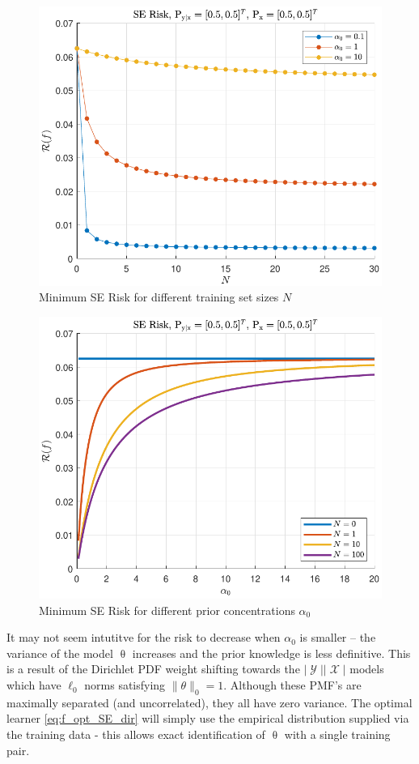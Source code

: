 \documentclass[12pt]{report}
\DeclareMathOperator{\Xcal}{\mathcal{X}}
\DeclareMathOperator{\Ycal}{\mathcal{Y}}
\begin{document}
\begin{figure}
\centering
\includegraphics[width=0.7\linewidth]{Risk_SE_Dir_IO_N_leg_a0.pdf}
\caption{Minimum SE Risk for different training set sizes $N$}
\label{fig:Risk_SE_Dir_IO_N_leg_a0}
\end{figure}

\begin{figure}
\centering
\includegraphics[width=0.7\linewidth]{Risk_SE_Dir_IO_a0_leg_N.pdf}
\caption{Minimum SE Risk for different prior concentrations $\alpha_0$}
\label{fig:Risk_SE_Dir_IO_a0_leg_N}
\end{figure}

It may not seem intutitve for the risk to decrease when $\alpha_0$ is smaller -- the variance of the model $\uptheta$ increases and the prior knowledge is less definitive. This is a result of the Dirichlet PDF weight shifting towards the $|\Ycal||\Xcal|$ models which have $\ell_0$ norms satisfying $\| \theta \|_0 = 1$. Although these PMF's are maximally separated (and uncorrelated), they all have zero variance. The optimal learner \eqref{eq:f_opt_SE_dir} will simply use the empirical distribution supplied via the training data - this allows exact identification of $\uptheta$ with a single training pair.
\end{document}
